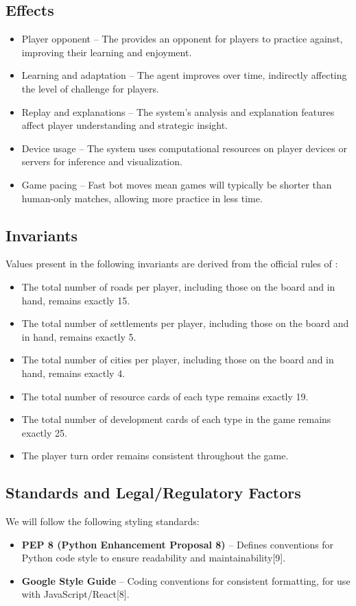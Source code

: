\documentclass{article}
\begin{document}
\subsection{Effects}\label{subsec:effects}
\begin{itemize}
    \item {Player opponent} – The \AI{} provides an opponent for players to practice against, improving their learning and enjoyment.
    \item {Learning and adaptation} – The \RL{} agent improves over time, indirectly affecting the level of challenge for players.
    \item {Replay and explanations} – The system's analysis and explanation features affect player understanding and strategic insight.
    \item {Device usage} – The system uses computational resources on player devices or servers for inference and visualization.
    \item {Game pacing} – Fast bot moves mean games will typically be shorter than human-only matches, allowing more practice in less time.
\end{itemize}

\subsection{Invariants}\label{subsec:invariants}
Values present in the following invariants are derived from the official rules of \emph{\Catan{}}:
\begin{itemize}
    \item The total number of roads per player, including those on the board and in hand, remains exactly 15.
    \item The total number of settlements per player, including those on the board and in hand, remains exactly 5.
    \item The total number of cities per player, including those on the board and in hand, remains exactly 4.
    \item The total number of resource cards of each type remains exactly 19.
    \item The total number of development cards of each type in the game remains exactly 25.
    \item The player turn order remains consistent throughout the game.
\end{itemize}


\subsection{Standards and Legal/Regulatory Factors}
We will follow the following styling standards:
\begin{itemize}
    \item \textbf{PEP 8 (Python Enhancement Proposal 8)} – Defines conventions for Python code style to ensure readability and maintainability[9].
    \item \textbf{Google Style Guide} – Coding conventions for consistent formatting, for use with JavaScript/React[8].
\end{itemize}
\end{document}
